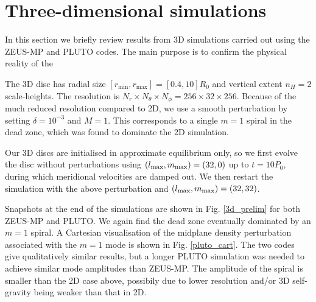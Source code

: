 \section{Three-dimensional simulations}
In this section we briefly review results from 3D simulations carried
out using the ZEUS-MP and PLUTO codes. The main purpose is to confirm
the physical reality of the 


The 3D disc has radial size 
$[r_\mathrm{min},r_\mathrm{max}]=[0.4,10]R_0$ and vertical extent
$n_H=2$ scale-heights. The resolution is $N_r\times N_\theta\times
N_\phi=256\times32\times256$. Because of the much reduced resolution
compared to 2D, we use a smooth perturbation by setting
$\delta = 10^{-3}$ and $M=1$. This corresponds to a single $m=1$
spiral in the dead zone, which was found to dominate the 2D
simulation. 

Our 3D discs are initialised in approximate equilibrium only, so we
first evolve the disc without perturbations using  
$(l_\mathrm{max},m_\mathrm{max})=(32,0)$ up to $t=10P_0$, during which 
meridional velocities are damped out. We then restart the simulation
with the above perturbation and $(l_\mathrm{max},m_\mathrm{max})=(32,32)$. 

Snapshots at the end of the simulations are shown in
Fig. \ref{3d_prelim} for both ZEUS-MP and PLUTO. We again find the dead zone eventually
dominated by an $m=1$ spiral. A Cartesian visualisation of the
midplane density perturbation associated with the $m=1$ mode is shown in Fig. \ref{pluto_cart}.
The two codes give qualitatively similar results, but a longer PLUTO simulation was
needed to achieve similar mode amplitudes than ZEUS-MP. 
The amplitude of the spiral is smaller than the 2D case above,
possibily due to lower resolution and/or 3D self-gravity being weaker
than that in 2D.  

